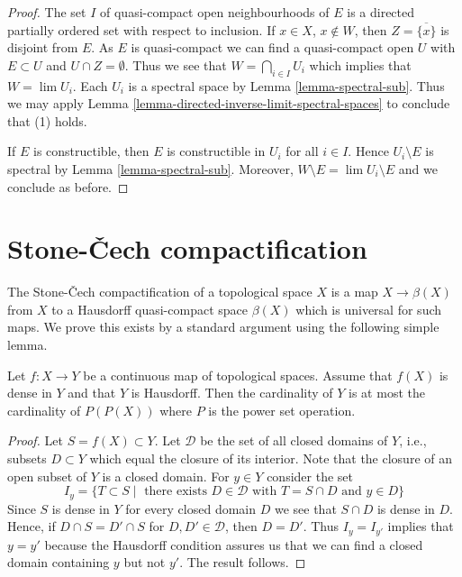 \begin{proof}
The set $I$ of quasi-compact open neighbourhoods of $E$ is a directed
partially ordered set with respect to inclusion. If $x \in X$, $x \not \in W$,
then $Z = \overline{\{x\}}$ is disjoint from $E$. As $E$ is quasi-compact
we can find a quasi-compact open $U$ with $E \subset U$ and
$U \cap Z = \emptyset$. Thus we see that $W = \bigcap_{i \in I} U_i$
which implies that $W = \lim U_i$.
Each $U_i$ is a spectral space by Lemma \ref{lemma-spectral-sub}.
Thus we may apply Lemma \ref{lemma-directed-inverse-limit-spectral-spaces}
to conclude that (1) holds.

\medskip\noindent
If $E$ is constructible, then $E$ is constructible in $U_i$
for all $i \in I$. Hence $U_i \setminus E$
is spectral by Lemma \ref{lemma-spectral-sub}.
Moreover, $W \setminus E = \lim U_i \setminus E$ and
we conclude as before.
\end{proof}





\section{Stone-{\v C}ech compactification}
\label{section-stone-cech}

\noindent
The Stone-{\v C}ech compactification of a topological space $X$
is a map $X \to \beta(X)$ from $X$ to a Hausdorff quasi-compact space
$\beta(X)$ which is universal for such maps. We prove this exists
by a standard argument using the following simple lemma.

\begin{lemma}
\label{lemma-dense-image}
Let $f : X \to Y$ be a continuous map of topological spaces. Assume that
$f(X)$ is dense in $Y$ and that $Y$ is Hausdorff. Then the cardinality
of $Y$ is at most the cardinality of $P(P(X))$ where $P$ is the power
set operation.
\end{lemma}

\begin{proof}
Let $S = f(X) \subset Y$. Let $\mathcal{D}$ be the set of all
closed domains of $Y$, i.e., subsets $D \subset Y$ which
equal the closure of its interior. Note that the closure of an
open subset of $Y$ is a closed domain. For $y \in Y$ consider the set
$$
I_y = \{T \subset S \mid \text{ there exists }
D \in \mathcal{D}\text{ with }T = S \cap D\text{ and }y \in D\}
$$
Since $S$ is dense in $Y$ for every closed domain $D$ we see
that $S \cap D$ is dense in $D$. Hence, if
$D \cap S = D' \cap S$ for $D, D' \in \mathcal{D}$, then
$D = D'$. Thus $I_y = I_{y'}$ implies that $y = y'$ because the
Hausdorff condition assures us that we can find a closed domain
containing $y$ but not $y'$. The result follows.
\end{proof}

